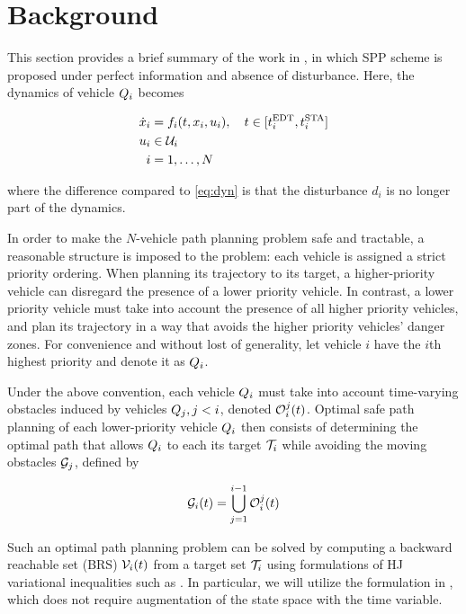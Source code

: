 \section{Background \label{sec:background}}
This section provides a brief summary of the work in \cite{Chen15}, in which SPP scheme is proposed under perfect information and absence of disturbance. Here, the dynamics of vehicle $Q_i$ becomes

\begin{equation}
\label{eq:dyn_no_dstb}
\begin{aligned}
\dot{x}_i &= f_i(t, x_i, u_i), \quad t \in [t^\text{EDT}_i, t^\text{STA}_i] \\
u_i &\in \mathcal{U}_i \\
i &= 1,\ldots, N
\end{aligned}
\end{equation}

\noindent where the difference compared to \eqref{eq:dyn} is that the disturbance $d_i$ is no longer part of the dynamics.

In order to make the $N$-vehicle path planning problem safe and tractable, a reasonable structure is imposed to the problem: each vehicle is assigned a strict priority ordering. When planning its trajectory to its target, a higher-priority vehicle can disregard the presence of a lower priority vehicle. In contrast, a lower priority vehicle must take into account the presence of all higher priority vehicles, and plan its trajectory in a way that avoids the higher priority vehicles' danger zones. For convenience and without lost of generality, let vehicle $i$ have the $i$th highest priority and denote it as $Q_i$. 

Under the above convention, each vehicle $Q_i$ must take into account time-varying obstacles induced by vehicles $Q_j, j<i$, denoted $\mathcal{O}_i^j(t)$. Optimal safe path planning of each lower-priority vehicle $Q_i$ then consists of determining the optimal path that allows $Q_i$ to each its target $\mathcal{T}_i$ while avoiding the moving obstacles $\mathcal{G}_j$, defined by

\begin{equation}
\mathcal{G}_i(t) = \bigcup_{j=1}^{i-1}\mathcal{O}_i^j(t)
\end{equation}

Such an optimal path planning problem can be solved by computing a backward reachable set (BRS) $\mathcal{V}_i(t)$ from a target set $\mathcal{T}_i$ using formulations of HJ variational inequalities such as \cite{Bokanowski11, Fisac15}. In particular, we will utilize the formulation in \cite{Fisac15}, which does not require augmentation of the state space with the time variable.

